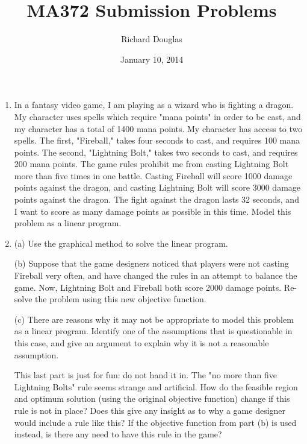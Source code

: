 \documentclass{article}
\title{MA372 Submission Problems}
\author{Richard Douglas}
\date{January 10,  2014}
\begin{document}
  \maketitle
  \begin{enumerate}
  \item In a fantasy video game, I am playing as a wizard who is fighting a dragon. My character
  uses spells which require "mana points" in order to be cast, and my character has a total of
  1400 mana points. My character has access to two spells. The first, "Fireball," takes four
  seconds to cast, and requires 100 mana points. The second, "Lightning Bolt," takes two
  seconds to cast, and requires 200 mana points. The game rules prohibit me from casting
  Lightning Bolt more than five times in one battle. Casting Fireball will score 1000 damage
  points against the dragon, and casting Lightning Bolt will score 3000 damage points against
  the dragon. The fight against the dragon lasts 32 seconds, and I want to score as many
  damage points as possible in this time. Model this problem as a linear program.
  \newline{}
  
  \item 
  (a) Use the graphical method to solve the linear program. \newline{}
  
  (b) Suppose that the game designers noticed that players were not casting Fireball
  very often, and have changed the rules in an attempt to balance the game. Now,
  Lightning Bolt and Fireball both score 2000 damage points. Re-solve the problem
  using this new objective function. \newline{}
  
  (c) There are reasons why it may not be appropriate to model this problem as a linear
  program. Identify one of the assumptions that is questionable in this case, and give
  an argument to explain why it is not a reasonable assumption. \newline{}
  
  This last part is just for fun: do not hand it in. The "no more than five Lightning Bolts"
  rule seems strange and artificial. How do the feasible region and optimum solution (using
  the original objective function) change if this rule is not in place? Does this give any insight
  as to why a game designer would include a rule like this? If the objective function from part
  (b) is used instead, is there any need to have this rule in the game?
  \end{enumerate}
  
\end{document}
